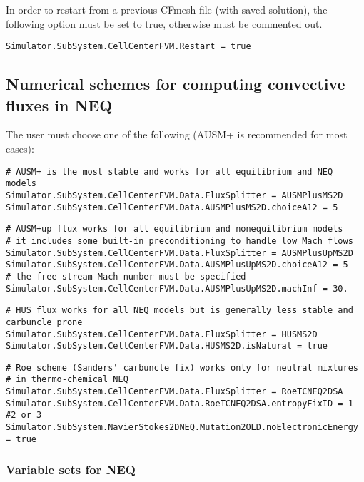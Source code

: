 \documentclass[11pt]{article}
\begin{document}
In order to restart from a previous CFmesh file (with saved solution), the following option must be set to true, 
otherwise must be commented out.
\begin{verbatim}
Simulator.SubSystem.CellCenterFVM.Restart = true
\end{verbatim}

\subsection{Numerical schemes for computing convective fluxes in NEQ}

The user must choose one of the following (AUSM+ is recommended for most cases):

\begin{verbatim}
# AUSM+ is the most stable and works for all equilibrium and NEQ models
Simulator.SubSystem.CellCenterFVM.Data.FluxSplitter = AUSMPlusMS2D
Simulator.SubSystem.CellCenterFVM.Data.AUSMPlusMS2D.choiceA12 = 5
\end{verbatim}

\begin{verbatim}
# AUSM+up flux works for all equilibrium and nonequilibrium models
# it includes some built-in preconditioning to handle low Mach flows
Simulator.SubSystem.CellCenterFVM.Data.FluxSplitter = AUSMPlusUpMS2D
Simulator.SubSystem.CellCenterFVM.Data.AUSMPlusUpMS2D.choiceA12 = 5
# the free stream Mach number must be specified
Simulator.SubSystem.CellCenterFVM.Data.AUSMPlusUpMS2D.machInf = 30.
\end{verbatim}

\begin{verbatim}
# HUS flux works for all NEQ models but is generally less stable and carbuncle prone
Simulator.SubSystem.CellCenterFVM.Data.FluxSplitter = HUSMS2D
Simulator.SubSystem.CellCenterFVM.Data.HUSMS2D.isNatural = true
\end{verbatim}

\begin{verbatim}
# Roe scheme (Sanders' carbuncle fix) works only for neutral mixtures
# in thermo-chemical NEQ
Simulator.SubSystem.CellCenterFVM.Data.FluxSplitter = RoeTCNEQ2DSA 
Simulator.SubSystem.CellCenterFVM.Data.RoeTCNEQ2DSA.entropyFixID = 1  #2 or 3 
Simulator.SubSystem.NavierStokes2DNEQ.Mutation2OLD.noElectronicEnergy = true
\end{verbatim}

\subsubsection{Variable sets for NEQ}
\end{document}
